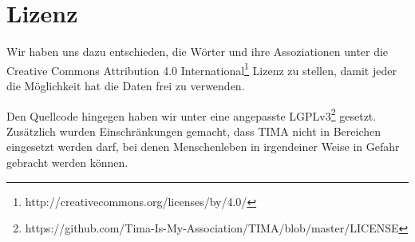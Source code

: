 \section{Lizenz}
Wir haben uns dazu entschieden, die Wörter und ihre Assoziationen unter die Creative Commons Attribution 4.0 International\footnote{http://creativecommons.org/licenses/by/4.0/} Lizenz zu stellen, damit jeder die Möglichkeit hat die Daten frei zu verwenden.

Den Quellcode hingegen haben wir unter eine angepasste LGPLv3\footnote{https://github.com/Tima-Is-My-Association/TIMA/blob/master/LICENSE} gesetzt. Zusätzlich wurden Einschränkungen gemacht, dass TIMA nicht in Bereichen eingesetzt werden darf, bei denen Menschenleben in irgendeiner Weise in Gefahr gebracht werden können.
